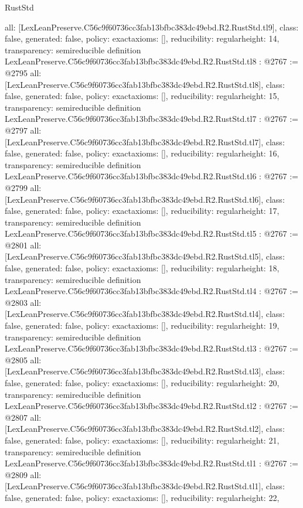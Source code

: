 \begin{lexlean}{RustStd}
\begin{coremodule}
{  all: [LexLeanPreserve.C56c9f60736cc3fab13bfbc383dc49ebd.R2.RustStd.tl9],
  class: false,
  generated: false,
  policy: exact{axioms: []},
  reducibility: regular{height: 14},
  transparency: semireducible
}
definition LexLeanPreserve.C56c9f60736cc3fab13bfbc383dc49ebd.R2.RustStd.tl8 : @2767 := @2795 {
  all: [LexLeanPreserve.C56c9f60736cc3fab13bfbc383dc49ebd.R2.RustStd.tl8],
  class: false,
  generated: false,
  policy: exact{axioms: []},
  reducibility: regular{height: 15},
  transparency: semireducible
}
definition LexLeanPreserve.C56c9f60736cc3fab13bfbc383dc49ebd.R2.RustStd.tl7 : @2767 := @2797 {
  all: [LexLeanPreserve.C56c9f60736cc3fab13bfbc383dc49ebd.R2.RustStd.tl7],
  class: false,
  generated: false,
  policy: exact{axioms: []},
  reducibility: regular{height: 16},
  transparency: semireducible
}
definition LexLeanPreserve.C56c9f60736cc3fab13bfbc383dc49ebd.R2.RustStd.tl6 : @2767 := @2799 {
  all: [LexLeanPreserve.C56c9f60736cc3fab13bfbc383dc49ebd.R2.RustStd.tl6],
  class: false,
  generated: false,
  policy: exact{axioms: []},
  reducibility: regular{height: 17},
  transparency: semireducible
}
definition LexLeanPreserve.C56c9f60736cc3fab13bfbc383dc49ebd.R2.RustStd.tl5 : @2767 := @2801 {
  all: [LexLeanPreserve.C56c9f60736cc3fab13bfbc383dc49ebd.R2.RustStd.tl5],
  class: false,
  generated: false,
  policy: exact{axioms: []},
  reducibility: regular{height: 18},
  transparency: semireducible
}
definition LexLeanPreserve.C56c9f60736cc3fab13bfbc383dc49ebd.R2.RustStd.tl4 : @2767 := @2803 {
  all: [LexLeanPreserve.C56c9f60736cc3fab13bfbc383dc49ebd.R2.RustStd.tl4],
  class: false,
  generated: false,
  policy: exact{axioms: []},
  reducibility: regular{height: 19},
  transparency: semireducible
}
definition LexLeanPreserve.C56c9f60736cc3fab13bfbc383dc49ebd.R2.RustStd.tl3 : @2767 := @2805 {
  all: [LexLeanPreserve.C56c9f60736cc3fab13bfbc383dc49ebd.R2.RustStd.tl3],
  class: false,
  generated: false,
  policy: exact{axioms: []},
  reducibility: regular{height: 20},
  transparency: semireducible
}
definition LexLeanPreserve.C56c9f60736cc3fab13bfbc383dc49ebd.R2.RustStd.tl2 : @2767 := @2807 {
  all: [LexLeanPreserve.C56c9f60736cc3fab13bfbc383dc49ebd.R2.RustStd.tl2],
  class: false,
  generated: false,
  policy: exact{axioms: []},
  reducibility: regular{height: 21},
  transparency: semireducible
}
definition LexLeanPreserve.C56c9f60736cc3fab13bfbc383dc49ebd.R2.RustStd.tl1 : @2767 := @2809 {
  all: [LexLeanPreserve.C56c9f60736cc3fab13bfbc383dc49ebd.R2.RustStd.tl1],
  class: false,
  generated: false,
  policy: exact{axioms: []},
  reducibility: regular{height: 22},
}
\end{coremodule}
\end{lexlean}
